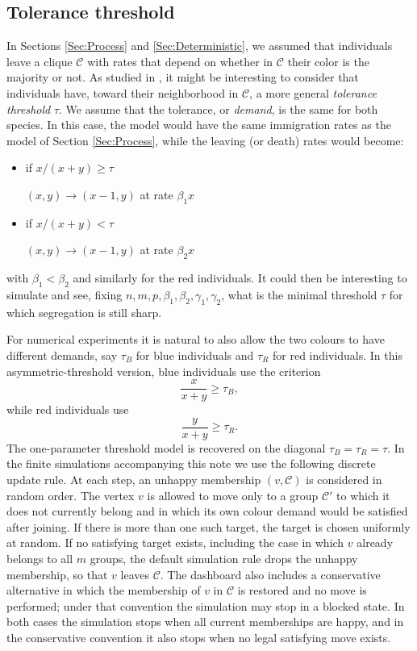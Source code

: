 \documentclass{article}
\theoremstyle{remark}
\newtheorem*{partial proof}{Partial proof of the Conjecture}
\begin{document}
\subsection{Tolerance threshold}
In Sections \ref{Sec:Process} and \ref{Sec:Deterministic}, we assumed that individuals leave a clique $\mathcal{C}$ with rates that depend on whether in $\mathcal{C}$ their color is the majority or not.
As studied in \cite{schelling1971dynamic}, it might be interesting to consider that individuals have, toward their neighborhood in $\mathcal{C}$, a more general \textit{tolerance threshold} $\tau$. We assume that the tolerance, or \textit{demand}, is the same for both species. In this case, the model would have the same immigration rates as the model of Section \ref{Sec:Process}, while the leaving (or death) rates would become:
\begin{itemize}
    \item if $x/(x+y)\geq \tau$
    \begin{center}
        $(x,y) \to (x-1,y)$ at rate $\beta_1 x$\\
    \end{center}
    \item if $x/(x+y)<\tau$
    \begin{center}
        $(x,y) \to (x-1,y)$ at rate $\beta_2 x$\\
    \end{center}
\end{itemize}
with $\beta_1<\beta_2$ and similarly for the red individuals. It could then be interesting to simulate and see, fixing $n,m,p,\beta_1,\beta_2,\gamma_1,\gamma_2$, what is the minimal threshold $\tau$ for which segregation is still sharp.

For numerical experiments it is natural to also allow the two colours to have different demands, say $\tau_B$ for blue individuals and $\tau_R$ for red individuals. In this asymmetric-threshold version, blue individuals use the criterion
$$
    \frac{x}{x+y}\geq \tau_B,
$$
while red individuals use
$$
    \frac{y}{x+y}\geq \tau_R.
$$
The one-parameter threshold model is recovered on the diagonal $\tau_B=\tau_R=\tau$. In the finite simulations accompanying this note we use the following discrete update rule. At each step, an unhappy membership $(v,\mathcal{C})$ is considered in random order. The vertex $v$ is allowed to move only to a group $\mathcal{C}'$ to which it does not currently belong and in which its own colour demand would be satisfied after joining. If there is more than one such target, the target is chosen uniformly at random. If no satisfying target exists, including the case in which $v$ already belongs to all $m$ groups, the default simulation rule drops the unhappy membership, so that $v$ leaves $\mathcal{C}$. The dashboard also includes a conservative alternative in which the membership of $v$ in $\mathcal{C}$ is restored and no move is performed; under that convention the simulation may stop in a blocked state. In both cases the simulation stops when all current memberships are happy, and in the conservative convention it also stops when no legal satisfying move exists.
\end{document}

